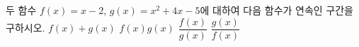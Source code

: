 두 함수 $f(x)=x-2$, $g(x)=x^2+4x-5$에 대하여 다음 함수가 연속인 구간을 구하시오.
 $f(x)+g(x)$
 $f(x)g(x)$
 $\dfrac{f(x)}{g(x)}$
 $\dfrac{g(x)}{f(x)}$
